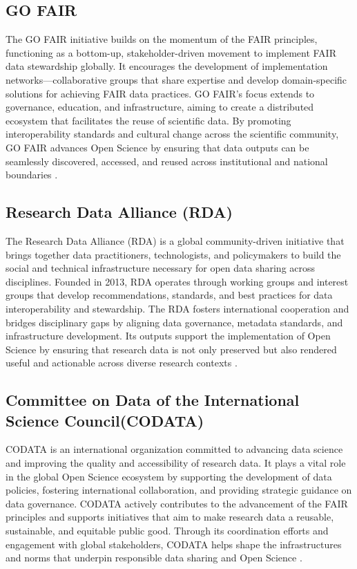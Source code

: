 \documentclass{article}
\begin{document}
\subsection{GO FAIR}
The GO FAIR initiative builds on the momentum of the FAIR principles, functioning as a bottom-up, stakeholder-driven movement to implement FAIR data stewardship globally. It encourages the development of implementation networks—collaborative groups that share expertise and develop domain-specific solutions for achieving FAIR data practices. GO FAIR’s focus extends to governance, education, and infrastructure, aiming to create a distributed ecosystem that facilitates the reuse of scientific data. By promoting interoperability standards and cultural change across the scientific community, GO FAIR advances Open Science by ensuring that data outputs can be seamlessly discovered, accessed, and reused across institutional and national boundaries \cite{henning_go_2019}.


\subsection{Research Data Alliance (RDA)}
The Research Data Alliance (RDA) is a global community-driven initiative that brings together data practitioners, technologists, and policymakers to build the social and technical infrastructure necessary for open data sharing across disciplines. Founded in 2013, RDA operates through working groups and interest groups that develop recommendations, standards, and best practices for data interoperability and stewardship. The RDA fosters international cooperation and bridges disciplinary gaps by aligning data governance, metadata standards, and infrastructure development. Its outputs support the implementation of Open Science by ensuring that research data is not only preserved but also rendered useful and actionable across diverse research contexts \cite{berman_research_2020}.

\subsection{Committee on Data of the International Science Council(CODATA)}
CODATA is an international organization committed to advancing data science and improving the quality and accessibility of research data. It plays a vital role in the global Open Science ecosystem by supporting the development of data policies, fostering international collaboration, and providing strategic guidance on data governance. CODATA actively contributes to the advancement of the FAIR principles and supports initiatives that aim to make research data a reusable, sustainable, and equitable public good. Through its coordination efforts and engagement with global stakeholders, CODATA helps shape the infrastructures and norms that underpin responsible data sharing and Open Science \cite{codata_2024}.
\end{document}
